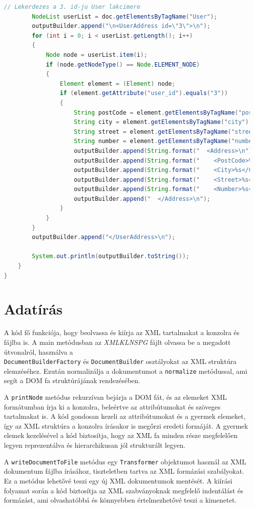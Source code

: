 \documentclass[12pt]{report}
\begin{document}
\begin{lstlisting}[caption={DOMQueryKLNSPG.java} olvasó program, language=Java]
		// Lekerdezes a 3. id-ju User lakcimere
		NodeList userList = doc.getElementsByTagName("User");
		outputBuilder.append("\n<UserAddress id=\"3\">\n");
		for (int i = 0; i < userList.getLength(); i++) 
		{
			Node node = userList.item(i);
			if (node.getNodeType() == Node.ELEMENT_NODE) 
			{
				Element element = (Element) node;
				if (element.getAttribute("user_id").equals("3")) 
				{
					String postCode = element.getElementsByTagName("post_code").item(0).getTextContent();
					String city = element.getElementsByTagName("city").item(0).getTextContent();
					String street = element.getElementsByTagName("street").item(0).getTextContent();
					String number = element.getElementsByTagName("number").item(0).getTextContent();
					outputBuilder.append(String.format("  <Address>\n"));
					outputBuilder.append(String.format("    <PostCode>%s</PostCode>\n", postCode));
					outputBuilder.append(String.format("    <City>%s</City>\n", city));
					outputBuilder.append(String.format("    <Street>%s</Street>\n", street));
					outputBuilder.append(String.format("    <Number>%s</Number>\n", number));
					outputBuilder.append("  </Address>\n");
				}
			}
		}
		outputBuilder.append("</UserAddress>\n");
		
		System.out.println(outputBuilder.toString());
	}
}
\end{lstlisting}

\section{Adatírás}
\indent\indent A kód fő funkciója, hogy beolvassa és kiírja az XML tartalmakat a konzolra és fájlba is. A main metódusban az \textit{XMLKLNSPG} fájlt olvassa be a megadott útvonalról, használva a \\ \texttt{DocumentBuilderFactory} és \texttt{DocumentBuilder} osztályokat az XML struktúra elemzéséhez. Ezután normalizálja a dokumentumot a \texttt{normalize} metódussal, ami segít a DOM fa struktúrájának rendezésében.

A \texttt{printNode} metódus rekurzívan bejárja a DOM fát, és az elemeket XML formátumban írja ki a konzolra, beleértve az attribútumokat és szöveges tartalmakat is. A kód gondosan kezeli az attribútumokat és a gyermek elemeket, így az XML struktúra a konzolra írásakor is megőrzi eredeti formáját. A gyermek elemek kezelésével a kód biztosítja, hogy az XML fa minden része megfelelően legyen reprezentálva és hierarchikusan jól strukturált legyen.

A \texttt{writeDocumentToFile} metódus egy \texttt{Transformer} objektumot használ az XML dokumentum fájlba írásához, tiszteletben tartva az XML formázási szabályokat. Ez a metódus lehetővé teszi egy új XML dokumentumok mentését. A kiírási folyamat során a kód biztosítja az XML szabványoknak megfelelő indentálást és formázást, ami olvashatóbbá és könnyebben értelmezhetővé teszi a kimenetet.
\end{document}

